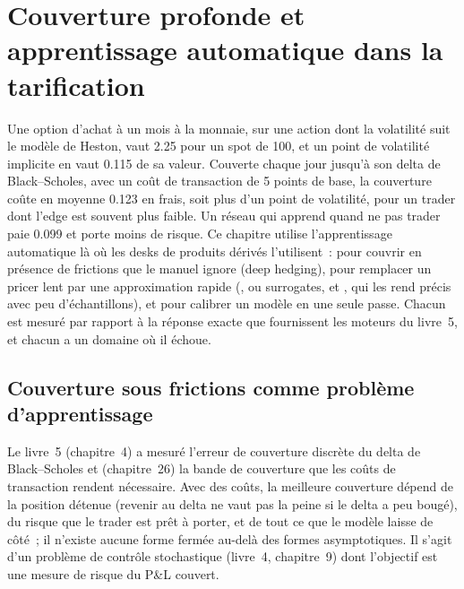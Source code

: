 \chapter{Couverture profonde et apprentissage automatique dans la tarification}\label{ch:ml:deep-hedging-and-machine-learning-in-pricing}

Une option d'achat à un mois à la monnaie, sur une action dont la volatilité suit le modèle de Heston, vaut 2.25 pour un spot de 100, et un point
de volatilité implicite en vaut 0.115 de sa valeur. Couverte chaque jour jusqu'à son delta de Black--Scholes, avec un coût de transaction de 5 points de base,
la couverture coûte en moyenne 0.123 en frais, soit plus d'un point de volatilité, pour un trader dont l'edge est souvent plus faible. Un
réseau qui apprend quand ne pas trader paie 0.099 et porte moins de risque. Ce chapitre utilise l'apprentissage automatique là où
les desks de produits dérivés l'utilisent~: pour couvrir en présence de frictions que le manuel ignore (deep hedging), pour remplacer un pricer lent par une
approximation rapide (, ou surrogates, et , qui les rend précis avec peu d'échantillons), et pour calibrer
un modèle en une seule passe. Chacun est mesuré par rapport à la réponse exacte que fournissent les moteurs du livre~5, et chacun a un domaine où il
échoue.

\section{Couverture sous frictions comme problème d'apprentissage}

Le livre~5 (chapitre~4) a mesuré l'erreur de couverture discrète du delta de Black--Scholes et (chapitre~26) la bande de couverture que
les coûts de transaction rendent nécessaire. Avec des coûts, la meilleure couverture dépend de la position détenue (revenir au delta ne vaut pas la peine
si le delta a peu bougé), du risque que le trader est prêt à porter, et de tout ce que le modèle laisse de côté~; il n'existe aucune
forme fermée au-delà des formes asymptotiques. Il s'agit d'un problème de contrôle stochastique (livre~4, chapitre~9) dont l'objectif est une mesure de risque
du P\&L couvert.

